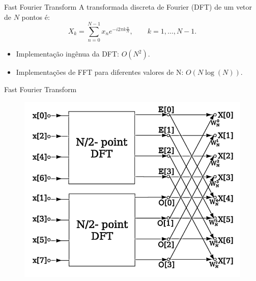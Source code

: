 \begin{frame}{Fast Fourier Transform}
A transformada discreta de Fourier (DFT) de um vetor de $N$ pontos é:
\[
X_k = \sum_{n=0}^{N-1} x_n e^{-i 2 \pi k \frac{n}{N}}, \hspace{2em} k = 1, \dots, N-1.
\]
\begin{itemize}
  \item Implementação ingênua da DFT: $O(N^2)$.
  \item Implementações de FFT para diferentes valores de N: $O(N \log(N))$.
\end{itemize}
\end{frame}

\begin{frame}{Fast Fourier Transform}
\begin{figure}
\includegraphics[height=0.8\textheight]{./img/butterfft.png}
\end{figure}
\end{frame}



